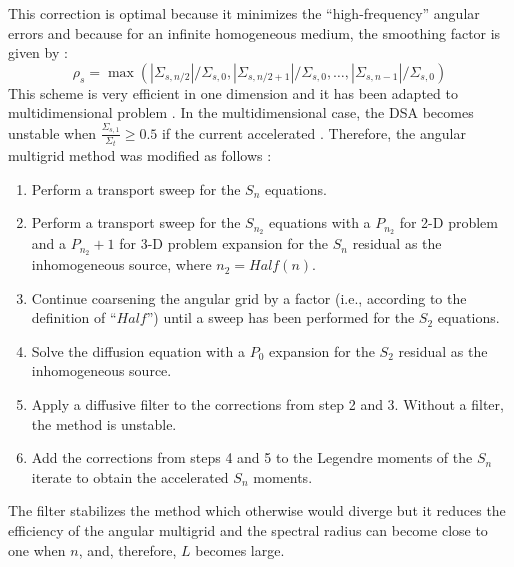 This correction is optimal because it minimizes the ``high-frequency'' angular
errors and because for an infinite homogeneous medium, the smoothing factor is
given by :
\begin{equation}
\rho_s =
\max(|\Sigma_{s,n/2}|/\Sigma_{s,0},|\Sigma_{s,n/2+1}|/\Sigma_{s,0},\hdots,
|\Sigma_{s,n-1}|/\Sigma_{s,0})
\end{equation}
This scheme is very efficient in one dimension and it has been adapted to
multidimensional problem \cite{multigrid_2d}. In the multidimensional case,
the DSA becomes unstable when $\frac{\Sigma_{s,1}}{\Sigma_{t}}\geq 0.5$ if the
current accelerated \cite{multisweep}. Therefore, the angular multigrid method
was modified as follows \cite{multigrid_2d} :
\begin{enumerate}
\item Perform a transport sweep for the $S_n$ equations.
\item Perform a transport sweep for the $S_{n_2}$ equations with a $P_{n_2}$
for 2-D problem and a $P_{n_2}+1$ for 3-D problem expansion for the $S_n$
residual as the inhomogeneous source, where $n_2=Half(n)$.
\item Continue coarsening the angular grid by a factor (i.e., according to the
definition of ``$Half$'') until a sweep has been performed for the $S_2$
equations.
\item Solve the diffusion equation with a $P_0$ expansion for the $S_2$
residual as the inhomogeneous source. 
\item Apply a diffusive filter to the corrections from step 2 and 3. Without a
filter, the method is unstable.
\item Add the corrections from steps 4 and 5 to the Legendre moments of the
$S_n$ iterate to obtain the accelerated $S_n$ moments.
\end{enumerate}
The filter stabilizes the method which otherwise would diverge but it reduces
the efficiency of the angular multigrid and the spectral radius can become
close to one when $n$, and, therefore, $L$ becomes large.
